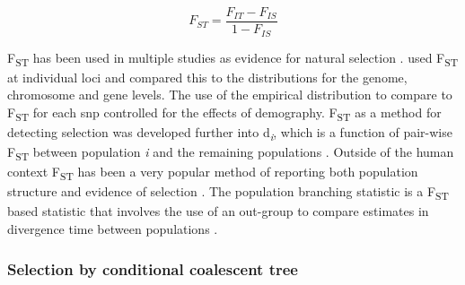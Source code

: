 \documentclass[twoside,openright]{report}
\begin{document}
\begin{equation} 
F_{ST} = \frac{F_{IT}{-}F_{IS}}{1{-}F_{IS}}
\label{eq:fst}
\end{equation}

F\textsubscript{ST} has been used in multiple studies as evidence for
natural selection
\citep{myles2007identification, pickrell2009signals, Akey2012}.
\citet{Akey2012} used F\textsubscript{ST} at individual loci and
compared this to the distributions for the genome, chromosome and gene
levels. The use of the empirical distribution to compare to
F\textsubscript{ST} for each \gls{snp} controlled for the effects of
demography. F\textsubscript{ST} as a method for detecting selection was
developed further into d\textsubscript{\emph{i}}, which is a function of
pair-wise F\textsubscript{ST} between population \emph{i} and the
remaining populations \citep{Akey2010}. Outside of the human context
F\textsubscript{ST} has been a very popular method of reporting both
population structure and evidence of selection
\citep{Akey2010, Hancock2011, Qanbari2011, Wei2015b}. The population
branching statistic is a F\textsubscript{ST} based statistic that
involves the use of an out-group to compare estimates in divergence time
between populations \citep{Yi2010b}.

\subsubsection{Selection by conditional coalescent
tree}\label{selection-by-conditional-coalescent-tree}
\end{document}
